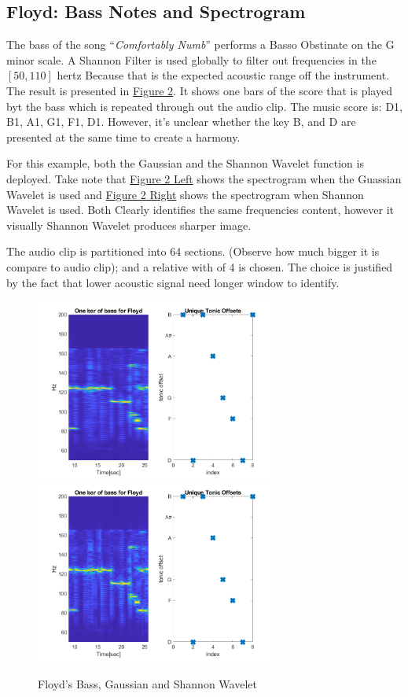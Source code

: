 \documentclass{article}
\begin{document}
    \subsection{Floyd: Bass Notes and Spectrogram}
        \par\hspace{1.1em}
        The bass of the song ``\textit{Comfortably Numb}'' performs a Basso Obstinate on the G minor scale. A Shannon Filter is used globally to filter out frequencies in the $[50, 110]$ hertz Because that is the expected acoustic range off the instrument. The result is presented in \hyperref[fig:2]{Figure 2}. It shows one bars of the score that is played byt the bass which is repeated through out the audio clip. The music score is: 
        D1, B1, A1, G1, F1, D1. However, it's unclear whether the key B, and D are presented at the same time to create a harmony. 
        \par
        For this example, both the Gaussian and the Shannon Wavelet function is deployed. Take note that \hyperref[fig:2]{Figure 2 Left} shows the spectrogram when the Guassian Wavelet is used and \hyperref[fig:2]{Figure 2 Right} shows the spectrogram when Shannon Wavelet is used. Both Clearly identifies the same frequencies content, however it visually Shannon Wavelet produces sharper image. 
        \par
        The audio clip is partitioned into 64 sections. (Observe how much bigger it is compare to audio clip); and a relative with of 4 is chosen. The choice is justified by the fact that lower acoustic signal need longer window to identify. 
        \begin{figure}[h]
            
            \includegraphics*[width=8cm]{floyd-bass-spectro.png}
            \includegraphics*[width=8cm]{floyd-bass-spectro-shannon.png}
            \caption{Floyd's Bass, Gaussian and Shannon Wavelet}
            \label{fig:2}
        \end{figure}
        
\end{document}

